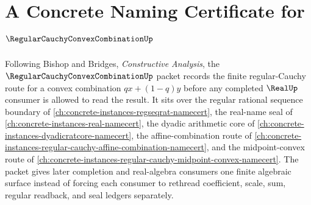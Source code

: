 \chapter{A Concrete Naming Certificate for $\RegularCauchyConvexCombinationUp$}
\label{ch:concrete-instances-regular-cauchy-convex-combination-namecert}

Following Bishop and Bridges, \emph{Constructive Analysis}, the $\RegularCauchyConvexCombinationUp$ packet records the finite regular-Cauchy route for a convex combination $q x+(1-q)y$ before any completed $\RealUp$ consumer is allowed to read the result. It sits over the regular rational sequence boundary of \autoref{ch:concrete-instances-regseqrat-namecert}, the real-name seal of \autoref{ch:concrete-instances-real-namecert}, the dyadic arithmetic core of \autoref{ch:concrete-instances-dyadicratcore-namecert}, the affine-combination route of \autoref{ch:concrete-instances-regular-cauchy-affine-combination-namecert}, and the midpoint-convex route of \autoref{ch:concrete-instances-regular-cauchy-midpoint-convex-namecert}. The packet gives later completion and real-algebra consumers one finite algebraic surface instead of forcing each consumer to rethread coefficient, scale, sum, regular readback, and seal ledgers separately.

